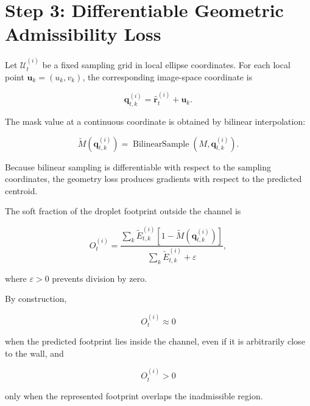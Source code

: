 \documentclass[11pt]{article}
\begin{document}
\section{Step 3: Differentiable Geometric Admissibility Loss}

Let $\mathcal{U}_{t}^{(i)}$ be a fixed sampling grid in local ellipse coordinates. For each local point $\bm{u}_{k}=(u_{k},v_{k})$, the corresponding image-space coordinate is

\begin{equation}
    \bm{q}_{t,k}^{(i)}
    =
    \hat{\bm{r}}_{t}^{(i)}
    +
    \bm{u}_{k}.
\end{equation}

The mask value at a continuous coordinate is obtained by bilinear interpolation:

\begin{equation}
    \widetilde{M}
    \left(
    \bm{q}_{t,k}^{(i)}
    \right)
    =
    \operatorname{BilinearSample}
    \left(
    M,
    \bm{q}_{t,k}^{(i)}
    \right).
\end{equation}

Because bilinear sampling is differentiable with respect to the sampling coordinates, the geometry loss produces gradients with respect to the predicted centroid.

The soft fraction of the droplet footprint outside the channel is

\begin{equation}
    O_{t}^{(i)}
    =
    \frac{
    \sum\limits_{k}
    \widetilde{E}_{t,k}^{(i)}
    \left[
    1-
    \widetilde{M}
    \left(
    \bm{q}_{t,k}^{(i)}
    \right)
    \right]
    }{
    \sum\limits_{k}
    \widetilde{E}_{t,k}^{(i)}
    +\varepsilon
    },
\end{equation}

where $\varepsilon>0$ prevents division by zero.

By construction,

\begin{equation}
    O_{t}^{(i)}\approx 0
\end{equation}

when the predicted footprint lies inside the channel, even if it is arbitrarily close to the wall, and

\begin{equation}
    O_{t}^{(i)}>0
\end{equation}

only when the represented footprint overlaps the inadmissible region.
\end{document}
